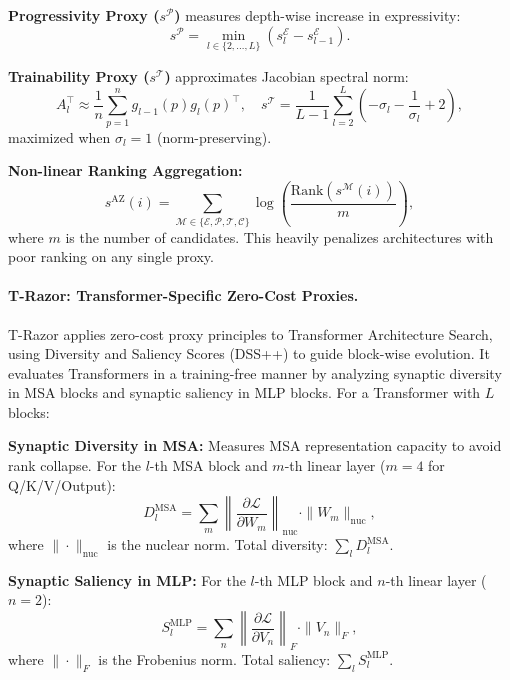 \textbf{Progressivity Proxy ($s^{\mathcal{P}}$)} measures depth-wise increase in expressivity:
\begin{equation}
	s^{\mathcal{P}}=\min_{l\in\{2,\ldots,L\}} \left( s^{\mathcal{E}}_{l} - s^{\mathcal{E}}_{l-1} \right).
\end{equation}

\textbf{Trainability Proxy ($s^{\mathcal{T}}$)} approximates Jacobian spectral norm:
\begin{equation}
	A_l^\top \approx \frac{1}{n}\sum_{p=1}^n g_{l-1}(p)g_l(p)^\top, \quad
	s^{\mathcal{T}}=\frac{1}{L-1}\sum_{l=2}^L \left(-\sigma_l - \frac{1}{\sigma_l} + 2\right),
\end{equation}
maximized when $\sigma_l=1$ (norm-preserving).

\textbf{Non-linear Ranking Aggregation:}
\begin{equation}
	s^{\text{AZ}}(i) = \sum_{\mathcal{M}\in\{\mathcal{E},\mathcal{P},\mathcal{T},\mathcal{C}\}} \log\left(\frac{\text{Rank}(s^{\mathcal{M}}(i))}{m}\right),
\end{equation}
where $m$ is the number of candidates. This heavily penalizes architectures with poor ranking on any single proxy.

\paragraph{T-Razor: Transformer-Specific Zero-Cost Proxies. \cite{zhou2022trazor}}
T-Razor applies zero-cost proxy principles to Transformer Architecture Search, using Diversity and Saliency Scores (DSS++) to guide block-wise evolution. It evaluates Transformers in a training-free manner by analyzing synaptic diversity in MSA blocks and synaptic saliency in MLP blocks. For a Transformer with $L$ blocks:

\textbf{Synaptic Diversity in MSA:} Measures MSA representation capacity to avoid rank collapse. For the $l$-th MSA block and $m$-th linear layer ($m=4$ for Q/K/V/Output):
\[
D_l^{\text{MSA}} = \sum_m \left\| \frac{\partial \mathcal{L}}{\partial W_m} \right\|_{\text{nuc}} \cdot \| W_m \|_{\text{nuc}},
\]
where $\|\cdot\|_{\text{nuc}}$ is the nuclear norm. Total diversity: $\sum_l D_l^{\text{MSA}}$.

\textbf{Synaptic Saliency in MLP:} For the $l$-th MLP block and $n$-th linear layer ($n=2$):
\[
S_l^{\text{MLP}} = \sum_n \left\| \frac{\partial \mathcal{L}}{\partial V_n} \right\|_F \cdot \| V_n \|_F,
\]
where $\|\cdot\|_F$ is the Frobenius norm. Total saliency: $\sum_l S_l^{\text{MLP}}$.

